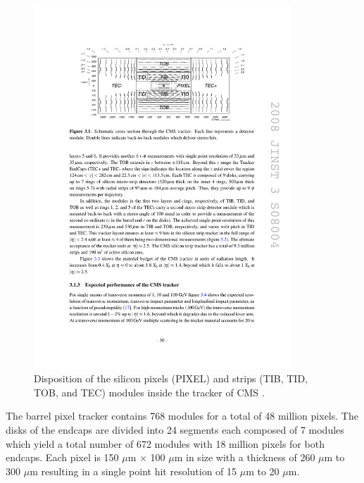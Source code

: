     \begin{figure}[h!]
      \centering
      \includegraphics[width=0.86\textwidth]{img/I-3-cms/tracker.pdf}
      \caption{Disposition of the silicon pixels (PIXEL) and strips (TIB, TID, TOB, and TEC) modules inside the tracker of CMS \cite{1748-0221-3-08-S08004}.}
      \label{fig:I-3-tracker}
    \end{figure}

    The barrel pixel tracker contains 768 modules for a total of 48 million pixels. The disks of the endcaps are divided into 24 segments each composed of 7 modules which yield a total number of 672 modules with 18 million pixels for both endcaps. Each pixel is 150 $\mu$m $\times$ 100 $\mu$m in size with a thickness of 260 $\mu$m to 300 $\mu$m resulting in a single point hit resolution of 15 $\mu$m to 20 $\mu$m. \\

